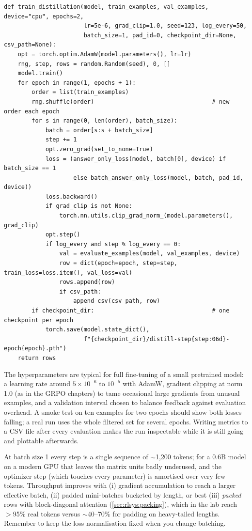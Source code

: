 \begin{lstlisting}[caption={Training loop for hard distillation (\texttt{llmsys/distill.py},
abridged).},label={lst:distill:train}]
def train_distillation(model, train_examples, val_examples, device="cpu", epochs=2,
                       lr=5e-6, grad_clip=1.0, seed=123, log_every=50,
                       batch_size=1, pad_id=0, checkpoint_dir=None, csv_path=None):
    opt = torch.optim.AdamW(model.parameters(), lr=lr)
    rng, step, rows = random.Random(seed), 0, []
    model.train()
    for epoch in range(1, epochs + 1):
        order = list(train_examples)
        rng.shuffle(order)                                  # new order each epoch
        for s in range(0, len(order), batch_size):
            batch = order[s:s + batch_size]
            step += 1
            opt.zero_grad(set_to_none=True)
            loss = (answer_only_loss(model, batch[0], device) if batch_size == 1
                    else batch_answer_only_loss(model, batch, pad_id, device))
            loss.backward()
            if grad_clip is not None:
                torch.nn.utils.clip_grad_norm_(model.parameters(), grad_clip)
            opt.step()
            if log_every and step % log_every == 0:
                val = evaluate_examples(model, val_examples, device)
                row = dict(epoch=epoch, step=step, train_loss=loss.item(), val_loss=val)
                rows.append(row)
                if csv_path:
                    append_csv(csv_path, row)
        if checkpoint_dir:                                  # one checkpoint per epoch
            torch.save(model.state_dict(),
                       f"{checkpoint_dir}/distill-step{step:06d}-epoch{epoch}.pth")
    return rows
\end{lstlisting}

The hyperparameters are typical for full fine-tuning of a small pretrained model: a learning
rate around $5\times10^{-6}$ to $10^{-5}$ with AdamW, gradient clipping at norm 1.0 (as in the
GRPO chapters) to tame occasional large gradients from unusual examples, and a validation
interval chosen to balance feedback against evaluation overhead. A smoke test on ten examples
for two epochs should show both losses falling; a real run uses the whole filtered set for
several epochs. Writing metrics to a CSV file after every evaluation makes the run inspectable
while it is still going and plottable afterwards.

\begin{systemslens}
At batch size 1 every step is a single sequence of $\sim$1{,}200 tokens; for a 0.6B model on a
modern GPU that leaves the matrix units badly underused, and the optimizer step (which touches
every parameter) is amortised over very few tokens. Throughput improves with (i) gradient
accumulation to reach a larger effective batch, (ii) padded mini-batches bucketed by length,
or best (iii) \emph{packed} rows with block-diagonal attention (\cref{sec:rlsys:packing}), which
in the lab reach $>$95\% real tokens versus $\sim$40--70\% for padding on heavy-tailed lengths.
Remember to keep the loss normalisation fixed when you change batching.
\end{systemslens}


